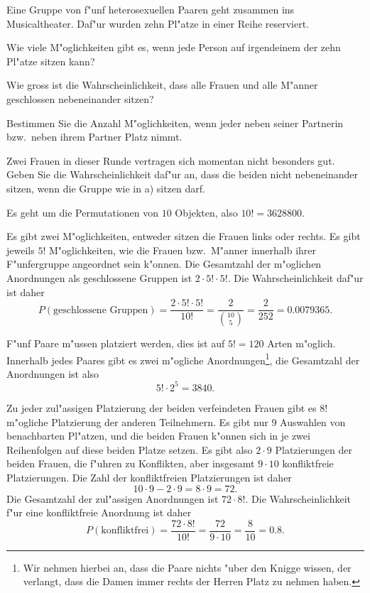 Eine Gruppe von f"unf heterosexuellen Paaren geht zusammen ins Musicaltheater.
Daf"ur wurden zehn Pl"atze in einer Reihe reserviert.
\begin{teilaufgaben}
\item
Wie viele M"oglichkeiten gibt es, wenn jede Person auf irgendeinem
der zehn Pl"atze sitzen kann?
\item 
Wie gross ist die Wahrscheinlichkeit, dass alle Frauen und alle M"anner
geschlossen nebeneinander sitzen?
\item
Bestimmen Sie die Anzahl M"oglichkeiten, wenn jeder neben seiner Partnerin
bzw.~neben ihrem Partner Platz nimmt.
\item
Zwei Frauen in dieser Runde vertragen sich momentan nicht besonders gut.
Geben Sie die Wahrscheinlichkeit daf"ur an, dass die beiden nicht 
nebeneinander sitzen, wenn die Gruppe wie in a) sitzen
darf.
\end{teilaufgaben}

\begin{loesung}
\begin{teilaufgaben}
\item
Es geht um die Permutationen von $10$ Objekten, also $10!=3628800$.
\item
Es gibt zwei M"oglichkeiten, entweder sitzen die Frauen links oder rechts.
Es gibt jeweils $5!$ M"oglichkeiten, wie die Frauen bzw.~M"anner innerhalb
ihrer F"unfergruppe angeordnet sein k"onnen. Die Gesamtzahl der m"oglichen
Anordnungen als geschlossene Gruppen ist $2\cdot 5!\cdot 5!$.
Die Wahrscheinlichkeit daf"ur ist daher
\[
P(\text{geschlossene Gruppen})
=
\frac{2\cdot 5!\cdot 5!}{10!}
=
\frac{2}{\binom{10}{5}}
=\frac2{252}=0.0079365.
\]
\item
F"unf Paare m"ussen platziert werden, dies ist auf $5!=120$ Arten
m"oglich.
Innerhalb jedes Paares gibt es zwei m"ogliche Anordnungen\footnote{Wir nehmen
hierbei an, dass die Paare nichts "uber den Knigge wissen, der verlangt,
dass die Damen immer rechts der Herren Platz zu nehmen haben.}, die
Gesamtzahl der Anordnungen ist also
\[
5!\cdot 2^5=3840.
\]
\item
Zu jeder zul"assigen Platzierung der beiden verfeindeten Frauen gibt es
$8!$ m"ogliche Platzierung der anderen Teilnehmern.
Es gibt nur $9$ Auswahlen von benachbarten Pl"atzen, und die beiden
Frauen k"onnen sich in je zwei Reihenfolgen auf diese beiden Platze
setzen.
Es gibt also $2\cdot 9$ Platzierungen
der beiden Frauen, die f"uhren zu Konflikten,
aber insgesamt $9\cdot 10$ konfliktfreie Platzierungen.
Die Zahl der konfliktfreien Platzierungen ist daher
\[
10\cdot 9-2\cdot 9= 8\cdot 9 = 72.
\]
Die Gesamtzahl der zul"assigen Anordnungen ist $72\cdot 8!$.
Die Wahrscheinlichkeit f"ur eine konfliktfreie Anordnung ist daher
\[
P(\text{konfliktfrei}) = \frac{72\cdot 8!}{10!}=\frac{72}{9\cdot 10}
=\frac{8}{10}=0.8.
\]
\end{teilaufgaben}
\end{loesung}

